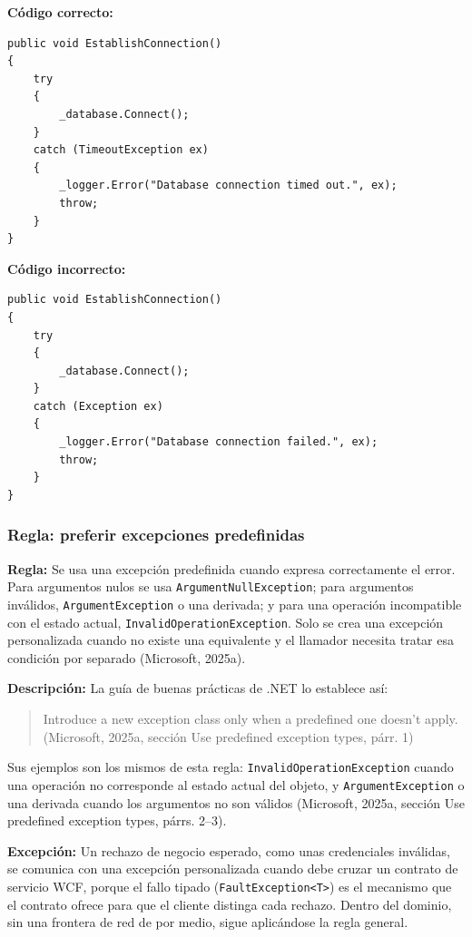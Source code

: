 \textbf{Código correcto:}
\begin{lstlisting}[style=csharpstyle]
public void EstablishConnection()
{
    try
    {
        _database.Connect();
    }
    catch (TimeoutException ex)
    {
        _logger.Error("Database connection timed out.", ex);
        throw;
    }
}
\end{lstlisting}

\textbf{Código incorrecto:}
\begin{lstlisting}[style=csharpstyle]
public void EstablishConnection()
{
    try
    {
        _database.Connect();
    }
    catch (Exception ex)
    {
        _logger.Error("Database connection failed.", ex);
        throw;
    }
}
\end{lstlisting}

\subsubsection{Regla: preferir excepciones predefinidas}

\textbf{Regla:} Se usa una excepción predefinida cuando expresa correctamente el error. Para argumentos nulos se usa \texttt{ArgumentNullException}; para argumentos inválidos, \texttt{ArgumentException} o una derivada; y para una operación incompatible con el estado actual, \texttt{InvalidOperationException}. Solo se crea una excepción personalizada cuando no existe una equivalente y el llamador necesita tratar esa condición por separado (Microsoft, 2025a).

\textbf{Descripción:} La guía de buenas prácticas de .NET lo establece así:
\begin{quote}
Introduce a new exception class only when a predefined one doesn't apply. (Microsoft, 2025a, sección Use predefined exception types, párr. 1)
\end{quote}
\noindent Sus ejemplos son los mismos de esta regla: \texttt{InvalidOperationException} cuando una operación no corresponde al estado actual del objeto, y \texttt{ArgumentException} o una derivada cuando los argumentos no son válidos (Microsoft, 2025a, sección Use predefined exception types, párrs. 2--3).

\textbf{Excepción:} Un rechazo de negocio esperado, como unas credenciales inválidas, se comunica con una excepción personalizada cuando debe cruzar un contrato de servicio WCF, porque el fallo tipado (\texttt{FaultException<T>}) es el mecanismo que el contrato ofrece para que el cliente distinga cada rechazo. Dentro del dominio, sin una frontera de red de por medio, sigue aplicándose la regla general.

